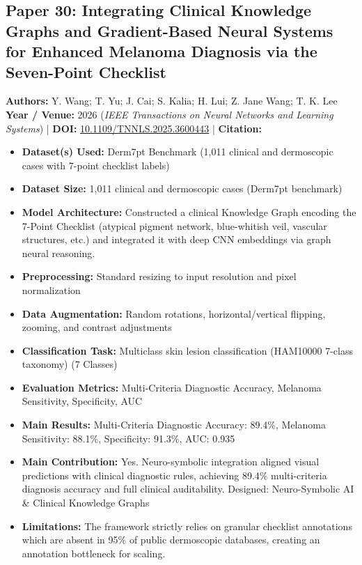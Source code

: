 \documentclass[11pt,a4paper]{article}
\begin{document}
\subsection{Paper 30: Integrating Clinical Knowledge Graphs and Gradient-Based Neural Systems for Enhanced Melanoma Diagnosis via the Seven-Point Checklist}
\textbf{Authors:} Y. Wang; T. Yu; J. Cai; S. Kalia; H. Lui; Z. Jane Wang; T. K. Lee \\
\textbf{Year / Venue:} 2026 (\textit{IEEE Transactions on Neural Networks and Learning Systems}) | \textbf{DOI:} \href{https://doi.org/10.1109/TNNLS.2025.3600443}{10.1109/TNNLS.2025.3600443} | \textbf{Citation:} \cite{11151232}

\begin{itemize}\small
\item \textbf{Dataset(s) Used:} Derm7pt Benchmark (1,011 clinical and dermoscopic cases with 7-point checklist labels)
\item \textbf{Dataset Size:} 1,011 clinical and dermoscopic cases (Derm7pt benchmark)
\item \textbf{Model Architecture:} Constructed a clinical Knowledge Graph encoding the 7-Point Checklist (atypical pigment network, blue-whitish veil, vascular structures, etc.) and integrated it with deep CNN embeddings via graph neural reasoning.
\item \textbf{Preprocessing:} Standard resizing to input resolution and pixel normalization
\item \textbf{Data Augmentation:} Random rotations, horizontal/vertical flipping, zooming, and contrast adjustments
\item \textbf{Classification Task:} Multiclass skin lesion classification (HAM10000 7-class taxonomy) (7 Classes)
\item \textbf{Evaluation Metrics:} Multi-Criteria Diagnostic Accuracy, Melanoma Sensitivity, Specificity, AUC
\item \textbf{Main Results:} Multi-Criteria Diagnostic Accuracy: 89.4\%, Melanoma Sensitivity: 88.1\%, Specificity: 91.3\%, AUC: 0.935
\item \textbf{Main Contribution:} Yes. Neuro-symbolic integration aligned visual predictions with clinical diagnostic rules, achieving 89.4\% multi-criteria diagnosis accuracy and full clinical auditability. Designed: Neuro-Symbolic AI \& Clinical Knowledge Graphs
\item \textbf{Limitations:} The framework strictly relies on granular checklist annotations which are absent in 95\% of public dermoscopic databases, creating an annotation bottleneck for scaling.

\end{itemize}
\end{document}

